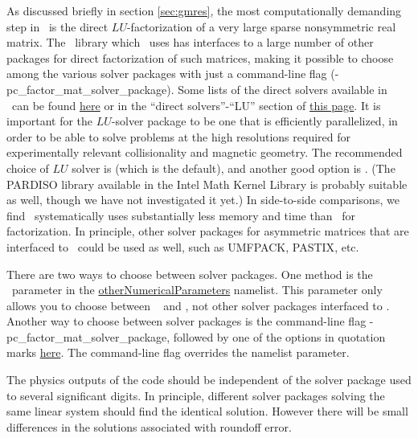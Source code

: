 As discussed briefly in section \ref{sec:gmres}, the most computationally demanding step in 
\sfincs~is the direct $LU$-factorization of a very large sparse nonsymmetric real matrix. The \PETSc~library
which \sfincs~uses has interfaces to a large number of other packages for direct factorization of such matrices,
making it possible to choose among the various solver packages with just a command-line flag ({\ttfamily -pc\_factor\_mat\_solver\_package}).  Some lists of the direct solvers
available in \PETSc~can be found \href{http://www.mcs.anl.gov/petsc/petsc-current/docs/manualpages/Mat/MatSolverPackage.html#MatSolverPackage}{here}
or in the ``direct solvers''-``LU'' section of \href{http://www.mcs.anl.gov/petsc/documentation/linearsolvertable.html}{this page}.
It is important for the $LU$-solver package to be one that is efficiently parallelized, 
in order to be able to solve problems at the high resolutions required for experimentally relevant collisionality and magnetic geometry.
The recommended choice of $LU$ solver is \href{http://mumps-solver.org/}{\mumps} (which is the default), and another good option is \href{http://crd-legacy.lbl.gov/~xiaoye/SuperLU/}{\superludist}.
(The {\ttfamily PARDISO} library available in the Intel Math Kernel Library is probably suitable as well, though we have not investigated it yet.)
In side-to-side comparisons, we find \mumps~systematically uses substantially less memory and time than \superludist~for factorization.
In principle, other solver packages for asymmetric matrices that are interfaced to \PETSc~could be used as well, such as {\ttfamily UMFPACK}, {\ttfamily PASTIX}, etc.

There are two ways to choose between solver packages.
One method is the \sfincs~parameter  in the 
{\ttfamily \hyperref[sec:otherNumericalParameters]{otherNumericalParameters}} namelist.
This parameter only allows you to choose between \mumps~ and \superludist, not other solver packages interfaced to \PETSc.
Another way to choose between solver packages is the command-line flag {\ttfamily -pc\_factor\_mat\_solver\_package},
followed by one of the options in quotation marks \href{http://www.mcs.anl.gov/petsc/petsc-current/docs/manualpages/Mat/MatSolverPackage.html#MatSolverPackage}{here}.
The command-line flag overrides the namelist parameter.

The physics outputs of the code should be independent of the solver package used to several significant digits.
In principle, different solver packages solving the same linear system should find the identical solution.
However there will be small differences in the solutions associated with roundoff error.

